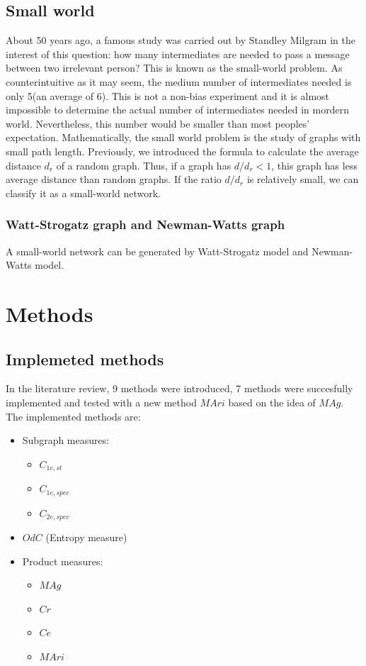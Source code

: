 \documentclass[12pt]{article}
\begin{document}
\subsection{Small world}
About 50 years ago, a famous study was carried out by Standley Milgram\cite{milgram1967small} in the interest of this question: how many intermediates are needed to pass a message between two irrelevant person? This is known as the small-world problem. As counterintuitive as it may seem, the medium number of intermediates needed is only 5(an average of 6). This is not a non-bias experiment and it is almost impossible to determine the actual number of intermediates needed in mordern world. Nevertheless, this number would be smaller than most peoples' expectation. Mathematically, the small world problem is the study of graphs with small path length. Previously, we introduced the formula to calculate the average distance $d_r$ of a random graph. Thus, if a graph has $d/d_r <1$, this graph has less average distance than random graphs. If the ratio $d/d_r$ is relatively small, we can classify it as a small-world network.\\

\subsubsection{Watt-Strogatz graph and Newman-Watts graph}
A small-world network can be generated by Watt-Strogatz model\cite{wsmodel} and Newman-Watts model.


\section{Methods}
\subsection{Implemeted methods}
In the literature review, 9 methods were introduced, 7 methods were succesfully implemented and tested with a new method $MAri$ based on the idea of $MAg$. The implemented methods are:
\begin{itemize}
    \item Subgraph measures:
    \begin{itemize}
        \item $C_{1e,st}$
        \item $C_{1e,spec}$
        \item $C_{2e,spec}$
    \end{itemize}
    \item $OdC$ (Entropy measure)
    \item Product measures:
    \begin{itemize}
        \item $MAg$
        \item $Cr$
        \item $Ce$
        \item $MAri$
    \end{itemize}
\end{itemize}
\end{document}
